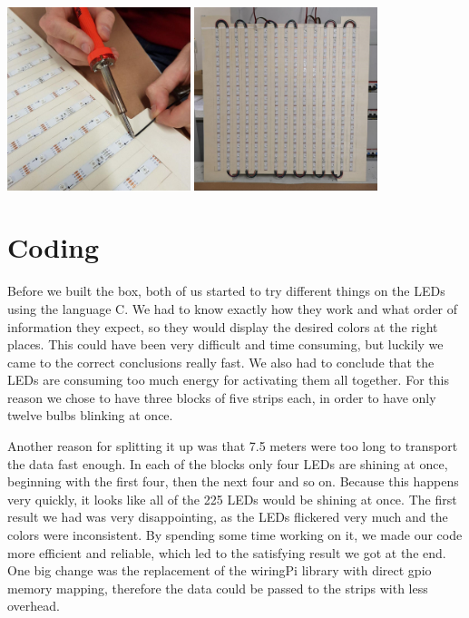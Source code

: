 \documentclass[a4paper,12pt]{article}
\begin{document}
{ \centering
  \includegraphics[width = 0.4\textwidth]{loten.jpg}
  \space{   }
  \includegraphics[width = 0.4\textwidth]{matrix.jpg}
  \\}
 \vspace{1cm}
 
\section{Coding}
Before we built the box, both of us started to try different things on the LEDs using the language C.
 We had to know exactly how they work and what order of information they expect, so they would display the desired colors at the right places.
 This could have been very difficult and time consuming, but luckily we came to the correct conclusions really fast.
 We also had to conclude that the LEDs are consuming too much energy for activating them all together.
 For this reason we chose to have three blocks of five strips each, in order to have only twelve bulbs blinking at once.
 
 Another reason for splitting it up was that 7.5 meters were too long to transport the data fast enough.
 In each of the blocks only four LEDs are shining at once, beginning with the first four, then the next four and so on.
 Because this happens very quickly, it looks like all of the 225 LEDs would be shining at once.
 The first result we had was very disappointing, as the LEDs flickered very much and the colors were inconsistent.
 By spending some time working on it, we made our code more efficient and reliable, which led to the satisfying result we got at the end.
 One big change was the replacement of the wiringPi library with direct gpio memory mapping, therefore the data could be passed to the strips with less overhead.
\end{document}
